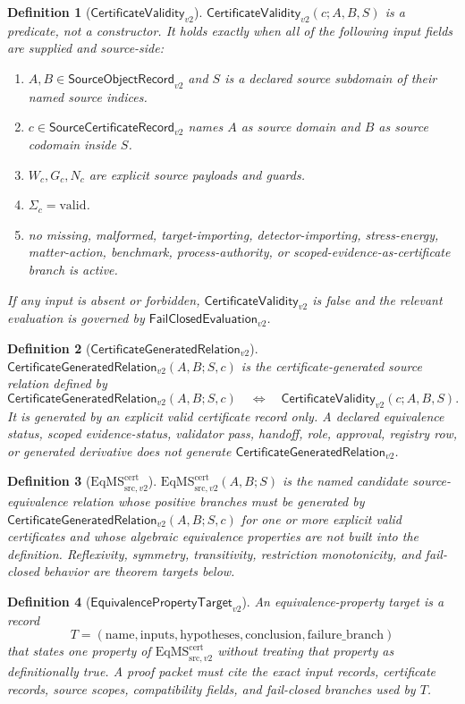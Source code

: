 \documentclass[11pt]{article}
\newcommand{\ObjRec}{\mathsf{SourceObjectRecord}_{v2}}
\newcommand{\CertRec}{\mathsf{SourceCertificateRecord}_{v2}}
\newcommand{\ValidTwo}{\mathsf{CertificateValidity}_{v2}}
\newcommand{\GenRel}{\mathsf{CertificateGeneratedRelation}_{v2}}
\newcommand{\EqMSTwo}{\mathrm{EqMS}^{\mathrm{cert}}_{\mathrm{src},v2}}
\newcommand{\TargetTwo}{\mathsf{EquivalencePropertyTarget}_{v2}}
\newcommand{\FailTwo}{\mathsf{FailClosedEvaluation}_{v2}}
\newtheorem{definition}{Definition}
\begin{document}
\begin{definition}[\(\ValidTwo\)]
\(\ValidTwo(c;A,B,S)\) is a predicate, not a constructor. It holds exactly
when all of the following input fields are supplied and source-side:
\begin{enumerate}[leftmargin=*]
  \item \(A,B\in\ObjRec\) and \(S\) is a declared source subdomain of their
  named source indices.
  \item \(c\in\CertRec\) names \(A\) as source domain and \(B\) as source
  codomain inside \(S\).
  \item \(W_c,G_c,N_c\) are explicit source payloads and guards.
  \item \(\Sigma_c=\mathrm{valid}\).
  \item no missing, malformed, target-importing, detector-importing,
  stress-energy, matter-action, benchmark, process-authority, or
  scoped-evidence-as-certificate branch is active.
\end{enumerate}
If any input is absent or forbidden, \(\ValidTwo\) is false and the relevant
evaluation is governed by \(\FailTwo\).
\end{definition}

\begin{definition}[\(\GenRel\)]
\(\GenRel(A,B;S,c)\) is the certificate-generated source relation defined by
\[
  \GenRel(A,B;S,c) \quad \Longleftrightarrow \quad \ValidTwo(c;A,B,S).
\]
It is generated by an explicit valid certificate record only. A declared
equivalence status, scoped evidence-status, validator pass, handoff, role,
approval, registry row, or generated derivative does not generate
\(\GenRel\).
\end{definition}

\begin{definition}[\(\EqMSTwo\)]
\(\EqMSTwo(A,B;S)\) is the named candidate source-equivalence relation whose
positive branches must be generated by \(\GenRel(A,B;S,c)\) for one or more
explicit valid certificates and whose algebraic equivalence properties are
not built into the definition. Reflexivity, symmetry, transitivity,
restriction monotonicity, and fail-closed behavior are theorem targets below.
\end{definition}

\begin{definition}[\(\TargetTwo\)]
An equivalence-property target is a record
\[
  T=(\mathrm{name},\mathrm{inputs},\mathrm{hypotheses},
  \mathrm{conclusion},\mathrm{failure\_branch})
\]
that states one property of \(\EqMSTwo\) without treating that property as
definitionally true. A proof packet must cite the exact input records,
certificate records, source scopes, compatibility fields, and fail-closed
branches used by \(T\).
\end{definition}
\end{document}
